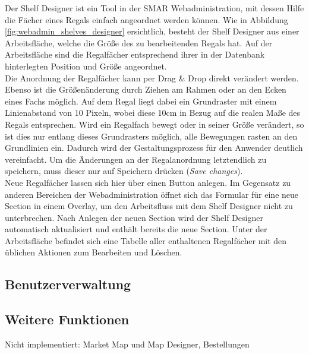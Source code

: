 Der Shelf Designer ist ein Tool in der SMAR Webadministration, mit dessen Hilfe die Fächer eines Regals einfach angeordnet werden können. Wie in Abbildung \ref{fig:webadmin_shelves_designer} ersichtlich, besteht der Shelf Designer aus einer Arbeitsfläche, welche die Größe des zu bearbeitenden Regals hat. Auf der Arbeitsfläche sind die Regalfächer entsprechend ihrer in der Datenbank hinterlegten Position und Größe angeordnet.\\

Die Anordnung der Regalfächer kann per Drag \& Drop direkt verändert werden. Ebenso ist die Größenänderung durch Ziehen am Rahmen oder an den Ecken eines Fachs möglich. Auf dem Regal liegt dabei ein Grundraster mit einem Linienabstand von 10 Pixeln, wobei diese 10cm in Bezug auf die realen Maße des Regals entsprechen. Wird ein Regalfach bewegt oder in seiner Größe verändert, so ist dies nur entlang dieses Grundrasters möglich, alle Bewegungen rasten an den Grundlinien ein. Dadurch wird der Gestaltungsprozess für den Anwender deutlich vereinfacht. Um die Änderungen an der Regalanordnung letztendlich zu speichern, muss dieser nur auf Speichern drücken (\emph{Save changes}).\\

Neue Regalfächer lassen sich hier über einen Button anlegen. Im Gegensatz zu anderen Bereichen der Webadministration öffnet sich das Formular für eine neue  Section in einem Overlay, um den Arbeitsfluss mit dem Shelf Designer nicht zu unterbrechen. Nach Anlegen der neuen Section wird der Shelf Designer automatisch aktualisiert und enthält bereits die neue Section. Unter der Arbeitsfläche befindet sich eine Tabelle aller enthaltenen Regalfächer mit den üblichen Aktionen zum Bearbeiten und Löschen.\\


\subsection{Benutzerverwaltung}


\subsection{Weitere Funktionen}
Nicht implementiert: Market Map und Map Designer, Bestellungen


